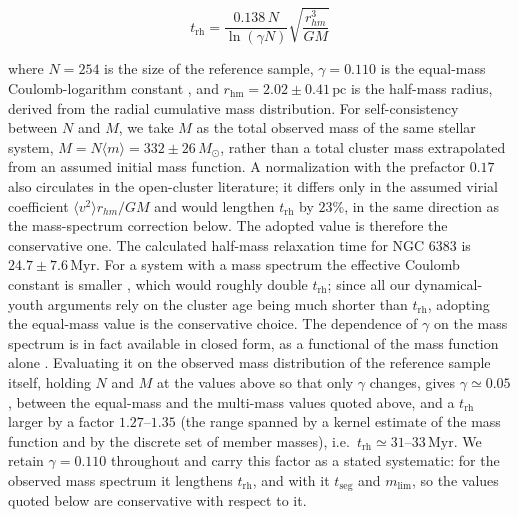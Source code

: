 \documentclass{aa}
\begin{document}
\begin{equation}
t_{\mathrm{rh}} = \frac{0.138\,N}{\ln(\gamma N)}\sqrt{\frac{r_{hm}^3}{GM}}
\end{equation}

where $N=254$ is the size of the reference sample, $\gamma = 0.110$ is the equal-mass Coulomb-logarithm constant \citep[not to be confused with the \textsc{HDBSCAN} density level $\lambda$ of Sect.~\ref{subsubsec:membership};][]{1994MNRAS.268..257G}, and $r_\mathrm{hm} = 2.02 \pm 0.41\,\mathrm{pc}$ is the half-mass radius, derived from the radial cumulative mass distribution. For self-consistency between $N$ and $M$, we take $M$ as the total observed mass of the same stellar system, $M = N\langle m \rangle = 332 \pm 26\,M_\odot$, rather than a total cluster mass extrapolated from an assumed initial mass function. A normalization with the prefactor $0.17$ also circulates in the open-cluster literature; it differs only in the assumed virial coefficient $\langle v^2\rangle r_{hm}/GM$ \citep[the value $0.4$ adopted here follows][]{1971ApJ...164..399S} and would lengthen $t_{\mathrm{rh}}$ by $23\%$, in the same direction as the mass-spectrum correction below. The adopted value is therefore the conservative one. The calculated half-mass relaxation time for NGC 6383 is $24.7\pm 7.6\,\mathrm{Myr}$. For a system with a mass spectrum the effective Coulomb constant is smaller \citep[$\gamma\simeq0.02$;][]{1996MNRAS.279.1037G}, which would roughly double $t_{\mathrm{rh}}$; since all our dynamical-youth arguments rely on the cluster age being much shorter than $t_{\mathrm{rh}}$, adopting the equal-mass value is the conservative choice. The dependence of $\gamma$ on the mass spectrum is in fact available in closed form, as a functional of the mass function alone \citep[his Eqs.~11 and 26]{1975IAUS...69..133H}. Evaluating it on the observed mass distribution of the reference sample itself, holding $N$ and $M$ at the values above so that only $\gamma$ changes, gives $\gamma\simeq0.05$, between the equal-mass and the multi-mass values quoted above, and a $t_{\mathrm{rh}}$ larger by a factor $1.27$--$1.35$ (the range spanned by a kernel estimate of the mass function and by the discrete set of member masses), i.e.\ $t_{\mathrm{rh}}\simeq31$--$33\,\mathrm{Myr}$. We retain $\gamma=0.110$ throughout and carry this factor as a stated systematic: for the observed mass spectrum it lengthens $t_{\mathrm{rh}}$, and with it $t_{\mathrm{seg}}$ and $m_{\mathrm{lim}}$, so the values quoted below are conservative with respect to it.
\end{document}
